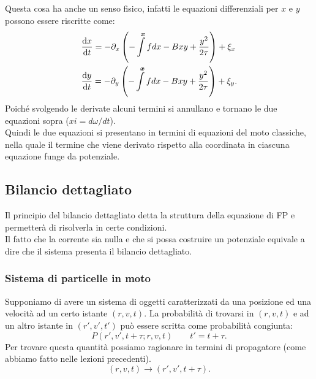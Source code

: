 \begin{exmp}[OU modificato]
    Questa cosa ha anche un senso fisico, infatti le equazioni differenziali per $x$ e $y$ possono essere riscritte come:
    \[\begin{aligned}
	&\frac{\text{d} x}{\text{d} t} = - \partial_{x}\left(-\int\limits^{\boldsymbol{x}} fdx - Bxy + \frac{y^2}{2\tau}\right) + \xi_x\\
	&\frac{\text{d} y}{\text{d} t} = - \partial_{y}\left(-\int\limits^{\boldsymbol{x}} fdx - Bxy + \frac{y^2}{2\tau}\right) + \xi_y
    .\end{aligned}\]
    Poiché svolgendo le derivate alcuni termini si annullano e tornano le due equazioni sopra ($xi = d\omega /dt$).\\
    Quindi le due equazioni si presentano in termini di equazioni del moto classiche, nella quale il termine che viene derivato rispetto alla coordinata in ciascuna equazione funge da potenziale.
\end{exmp}
\noindent
\subsection{Bilancio dettagliato}%
\label{sub:Bilancio dettagliato}
Il principio del bilancio dettagliato detta la struttura della equazione di FP e permetterà di risolverla in certe condizioni.\\
Il fatto che la corrente sia nulla e che si possa costruire un potenziale equivale a dire che il sistema presenta il bilancio dettagliato.
\subsubsection{Sistema di particelle in moto}%
\label{subsub:Sistema di particelle in moto}
Supponiamo di avere un sistema di oggetti caratterizzati da una posizione ed una  velocità ad un certo istante $(r,v,t)$.
La probabilità di trovarsi in $(r,v,t)$ e ad un altro istante in $(r',v',t')$ può essere scritta come probabilità congiunta:
\[
    P(r',v',t+\tau; r,v,t) \qquad t' = t+\tau
.\] 
Per trovare questa quantità possiamo ragionare in termini di propagatore (come abbiamo fatto nelle lezioni precedenti).
\[
    (r,v,t) \to (r',v',t+\tau) 
.\] 
